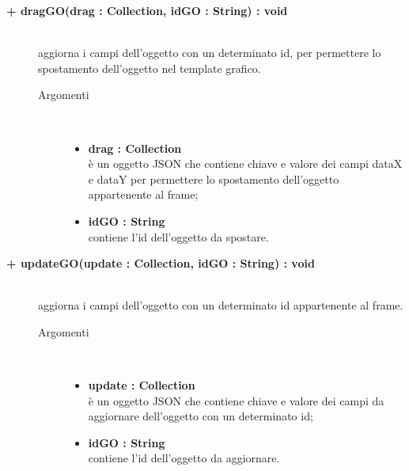 \begin{description}
\begin{description}
\end{description}

\begin{description}
		\item[\textbf{+ dragGO(drag : Collection, idGO : String) : void			}] \hfill \\
			aggiorna i campi dell'oggetto con un determinato id, per permettere lo spostamento dell'oggetto nel template grafico.    

\begin{description}
			\item[Argomenti] \hfill \\
				\begin{itemize}
					\item \textbf{drag : Collection			} \hfill \\
					è un oggetto JSON che contiene chiave e valore dei campi dataX e dataY per permettere lo spostamento dell'oggetto appartenente al frame;
					\item \textbf{idGO : String			} \hfill \\
					contiene l'id dell'oggetto da spostare.
				\end{itemize}

\end{description}

\end{description}

\begin{description}
		\item[\textbf{+ updateGO(update : Collection, idGO : String) : void			}] \hfill \\
			aggiorna i campi dell'oggetto con un determinato id appartenente al frame.  

\begin{description}
			\item[Argomenti] \hfill \\
				\begin{itemize}
						\item \textbf{update : Collection			} \hfill \\
					è un oggetto JSON che contiene chiave e valore dei campi da aggiornare dell'oggetto con un determinato id;
					\item \textbf{idGO : String			} \hfill \\
					contiene l'id dell'oggetto da aggiornare.
				\end{itemize}

\end{description}

\end{description}



\end{description}






